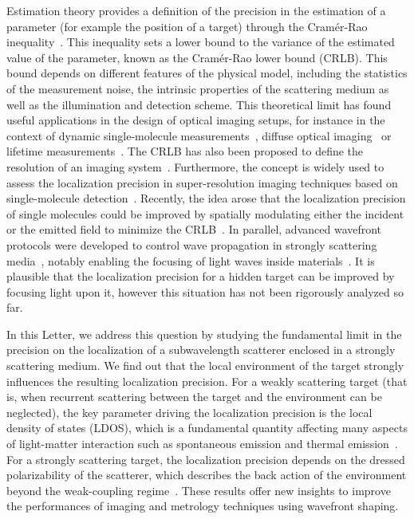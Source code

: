 \documentclass[aps,prl,twocolumn,amsmath,amssymb,superscriptaddress,10pt,nobibnotes]{revtex4-2}
\begin{document}
Estimation theory provides a definition of the precision in the estimation of a parameter (for example the position of a target) through the Cramér-Rao inequality~\cite{kay_fundamentals_1993}. This inequality sets a lower bound to the variance of the estimated value of the parameter, known as the Cramér-Rao lower bound (CRLB). This bound depends on different features of the physical model, including the statistics of the measurement noise, the intrinsic properties of the scattering medium as well as the illumination and detection scheme. This theoretical limit has found useful applications in the design of optical imaging setups, for instance in the context of dynamic single-molecule measurements~\cite{watkins_information_2004}, diffuse optical imaging~\cite{boffety_analysis_2008} or lifetime measurements~\cite{kollner_how_1992,bouchet_cramer-rao_2019}. The CRLB has also been proposed to define the resolution of an imaging system~\cite{ram_beyond_2006,sentenac_influence_2007}. Furthermore, the concept is widely used to assess the localization precision in super-resolution imaging techniques based on single-molecule detection~\cite{ober_localization_2004,mortensen_optimized_2010,deschout_precisely_2014}. Recently, the idea arose that the localization precision of single molecules could be improved by spatially modulating either the incident or the emitted field to minimize the CRLB~\cite{shechtman_optimal_2014,balzarotti_nanometer_2017}. In parallel, advanced wavefront protocols were developed to control wave propagation in strongly scattering media~\cite{mosk_controlling_2012}, notably enabling the focusing of light waves inside materials~\cite{vellekoop_demixing_2008,hsieh_digital_2010,choi_measurement_2013,ma_time-reversed_2014,ambichl_focusing_2017,ruan_focusing_2017}. It is plausible that the localization precision for a hidden target can be improved by focusing light upon it, however this situation has not been rigorously analyzed so far.

In this Letter, we address this question by studying the fundamental limit in the precision on the localization of a subwavelength scatterer enclosed in a strongly scattering medium. We find out that the local environment of the target strongly influences the resulting localization precision. For a weakly scattering target (that is, when recurrent scattering between the target and the environment can be neglected), the key parameter driving the localization precision is the local density of states (LDOS), which is a fundamental quantity affecting many aspects of light-matter interaction such as spontaneous emission and thermal emission~\cite{barnes_fluorescence_1998,carminati_electromagnetic_2015}. For a strongly scattering target, the localization precision depends on the dressed polarizability of the scatterer, which describes the back action of the environment beyond the weak-coupling regime~\cite{bouchet_quantum_2019}. These results offer new insights to improve the performances of imaging and metrology techniques using wavefront shaping.
\end{document}
